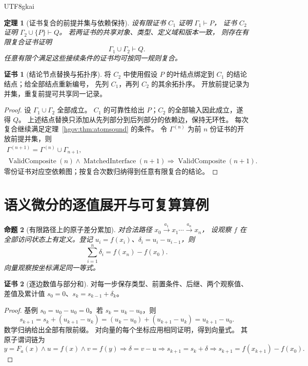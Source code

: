 \documentclass[12pt,a4paper,openany,notitlepage]{report}
\theoremstyle{plain}
\newtheorem{theorem}{定理}[chapter]
\newtheorem{proposition}[theorem]{命题}
\theoremstyle{definition}
\newtheorem*{certificate}{证书}
\theoremstyle{remark}
\def\mathcal#1{#1}\def\mathsf#1{#1}\def\mathbb#1{#1}%
\begin{document}
\begin{CJK*}{UTF8}{gkai}
\begin{theorem}[证书复合的前提并集与依赖保持]
\label{exp:logic:certificate-composition}
设有限证书 $\mathcal C_1$ 证明 $\Gamma_1\vdash P$，
证书 $\mathcal C_2$ 证明 $\Gamma_2\cup\{P\}\vdash Q$。
若两证书的共享对象、类型、定义域和版本一致，
则存在有限复合证书证明
\[
 \Gamma_1\cup\Gamma_2\vdash Q.
\]
任意有限个满足这些接续条件的证书均可按同一规则复合。
\end{theorem}
\begin{certificate}[结论节点替换与拓扑序]
将 $\mathcal C_2$ 中使用假设 $P$ 的叶结点绑定到
$\mathcal C_1$ 的结论结点；给全部结点重新编号，
先列 $\mathcal C_1$，再列 $\mathcal C_2$ 的其余拓扑序。
开放前提记录为并集，重复前提可共享同一记录。
\end{certificate}
\begin{proof}
设 $\Gamma_1\cup\Gamma_2$ 全部成立。
$\mathcal C_1$ 的可靠性给出 $P$；$\mathcal C_2$ 的全部输入因此成立，遂得 $Q$。
上述结点替换只添加从先列部分到后列部分的依赖边，保持无环性。
每次复合继续满足定理~\ref{hgov:thm:atomsound} 的条件。
令 $\Gamma^{(n)}$ 为前 $n$ 份证书的开放前提并集，则
\[
 \begin{gathered}
 \Gamma^{(n+1)}=\Gamma^{(n)}\cup\Gamma_{n+1},\\
 \operatorname{ValidComposite}(n)\land\operatorname{MatchedInterface}(n+1)
 \Rightarrow\operatorname{ValidComposite}(n+1).
 \end{gathered}
\]
零份证书对应空依赖图；按复合次数归纳得到任意有限复合的结论。
\end{proof}

\section{语义微分的逐值展开与可复算算例}

\begin{proposition}[有限路径上的原子差分累加]
\label{exp:logic:telescoping}
对合法路径 $x_0\xrightarrow{a_1}x_1\cdots\xrightarrow{a_n}x_n$，
设观察 $f$ 在全部访问状态上有定义。登记
$u_i=f(x_i)$、$\delta_i=u_i-u_{i-1}$，则
\[
 \sum_{i=1}^{n}\delta_i=f(x_n)-f(x_0).
\]
向量观察按坐标满足同一等式。
\end{proposition}
\begin{certificate}[逐边数值与部分和]
对每一步保存类型、前置条件、后继、两个观察值、差值及累计值
$s_0=0$、$s_k=s_{k-1}+\delta_k$。
\end{certificate}
\begin{proof}
基例 $s_0=u_0-u_0=0$。若 $s_k=u_k-u_0$，则
\[
 s_{k+1}=s_k+(u_{k+1}-u_k)
 =(u_k-u_0)+(u_{k+1}-u_k)=u_{k+1}-u_0.
\]
数学归纳给出全部有限前缀。
对向量的每个坐标应用相同证明，得到向量式。
其原子谓词链为
\[
 y=F_a(x)\land u=f(x)\land v=f(y)
 \Rightarrow\delta=v-u
 \Rightarrow s_{k+1}=s_k+\delta
 \Rightarrow s_{k+1}=f(x_{k+1})-f(x_0).
\]
\end{proof}


\end{CJK*}
\end{document}
